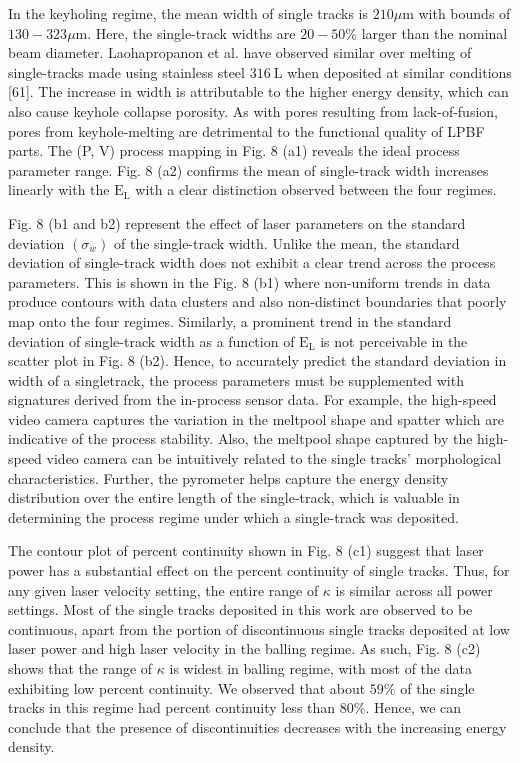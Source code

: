 \documentclass[10pt]{article}
\begin{document}
In the keyholing regime, the mean width of single tracks is $210 \mu \mathrm{m}$ with bounds of $130-323 \mu \mathrm{m}$. Here, the single-track widths are $20-50 \%$ larger than the nominal beam diameter. Laohapropanon et al. have observed similar over melting of single-tracks made using stainless steel $316 \mathrm{~L}$ when deposited at similar conditions [61]. The increase in width is attributable to the higher energy density, which can also cause keyhole collapse porosity. As with pores resulting from lack-of-fusion, pores from keyhole-melting are detrimental to the functional quality of LPBF parts. The (P, V) process mapping in Fig. 8 (a1) reveals the ideal process parameter range. Fig. 8 (a2) confirms the mean of single-track width increases linearly with the $\mathrm{E}_{\mathrm{L}}$ with a clear distinction observed between the four regimes.

Fig. 8 (b1 and b2) represent the effect of laser parameters on the standard deviation $\left(\sigma_{w}\right)$ of the single-track width. Unlike the mean, the standard deviation of single-track width does not exhibit a clear trend across the process parameters. This is shown in the Fig. 8 (b1) where non-uniform trends in data produce contours with data clusters and also non-distinct boundaries that poorly map onto the four regimes. Similarly, a prominent trend in the standard deviation of single-track width as a function of $\mathrm{E}_{\mathrm{L}}$ is not perceivable in the scatter plot in Fig. 8 (b2). Hence, to accurately predict the standard deviation in width of a singletrack, the process parameters must be supplemented with signatures derived from the in-process sensor data. For example, the high-speed video camera captures the variation in the meltpool shape and spatter which are indicative of the process stability. Also, the meltpool shape captured by the high-speed video camera can be intuitively related to the single tracks' morphological characteristics. Further, the pyrometer helps capture the energy density distribution over the entire length of the single-track, which is valuable in determining the process regime under which a single-track was deposited.

The contour plot of percent continuity shown in Fig. 8 (c1) suggest that laser power has a substantial effect on the percent continuity of single tracks. Thus, for any given laser velocity setting, the entire range of $\kappa$ is similar across all power settings. Most of the single tracks deposited in this work are observed to be continuous, apart from the portion of discontinuous single tracks deposited at low laser power and high laser velocity in the balling regime. As such, Fig. 8 (c2) shows that the range of $\kappa$ is widest in balling regime, with most of the data exhibiting low percent continuity. We observed that about $59 \%$ of the single tracks in this regime had percent continuity less than $80 \%$. Hence, we can conclude that the presence of discontinuities decreases with the increasing energy density.
\end{document}
